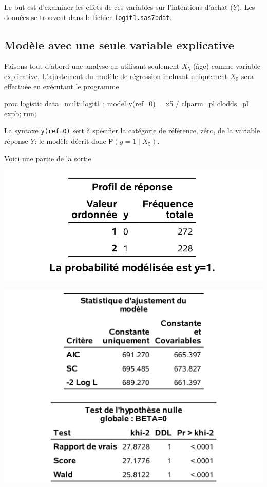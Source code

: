 \documentclass[
  11pt,
  letterpaper,
]{book}
\newenvironment{Shaded}{\begin{snugshade}}{\end{snugshade}}
\newcommand{\NormalTok}[1]{#1}
\theoremstyle{definition}
\theoremstyle{definition}
\theoremstyle{definition}
\theoremstyle{definition}
\theoremstyle{remark}
\begin{document}
Le but est d'examiner les effets de ces variables sur l'intentions d'achat (\(Y\)). Les données se trouvent dans le fichier \texttt{logit1.sas7bdat}.

\hypertarget{moduxe8le-avec-une-seule-variable-explicative}{%
\subsection{Modèle avec une seule variable explicative}\label{moduxe8le-avec-une-seule-variable-explicative}}

Faisons tout d'abord une analyse en utilisant seulement \(X_5\) (âge) comme variable explicative. L'ajustement du modèle de régression incluant uniquement \(X_5\) sera effectuée en exécutant le programme

\begin{Shaded}
\begin{Highlighting}[]
\NormalTok{proc logistic data=multi.logit1 ;}
\NormalTok{model y(ref=\textquotesingle{}0\textquotesingle{}) = x5 / clparm=pl clodds=pl expb;}
\NormalTok{run;}
\end{Highlighting}
\end{Shaded}

La syntaxe \texttt{y(ref=\textquotesingle{}0\textquotesingle{})} sert à spécifier la catégorie de référence, zéro, de la variable réponse \(Y\): le modèle décrit donc \({\mathsf P}\left(y=1 \mid X_5\right)\).

Voici une partie de la sortie

\begin{center}\includegraphics[width=0.63\linewidth]{figures/03-logistic-e1} \end{center}

\begin{center}\includegraphics[width=0.8\linewidth]{figures/03-logistic-e2} \end{center}
\end{document}
